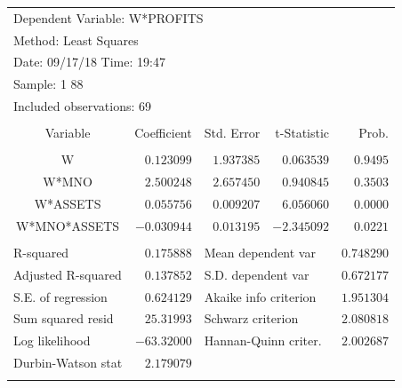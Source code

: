 \documentclass[12pt]{report}
\begin{document}
\begin{table}[H]
	\centering
	\begin{tabular}{lrrrr}
		\multicolumn{4}{l}{Dependent Variable: W*PROFITS}&\multicolumn{1}{c}{}\\
		\multicolumn{3}{l}{Method: Least Squares}&\multicolumn{1}{c}{}&\multicolumn{1}{c}{}\\
		\multicolumn{3}{l}{Date: 09/17/18   Time: 19:47}&\multicolumn{1}{c}{}&\multicolumn{1}{c}{}\\
		\multicolumn{2}{l}{Sample: 1 88}&\multicolumn{1}{c}{}&\multicolumn{1}{c}{}&\multicolumn{1}{c}{}\\
		\multicolumn{3}{l}{Included observations: 69}&\multicolumn{1}{c}{}&\multicolumn{1}{c}{}\\
		[4.5pt] \hline \\ [-4.5pt]
		\multicolumn{1}{c}{Variable}&\multicolumn{1}{r}{Coefficient}&\multicolumn{1}{r}{Std. Error}&\multicolumn{1}{r}{t-Statistic}&\multicolumn{1}{r}{Prob.}\\
		[4.5pt] \hline \\ [-4.5pt]
		\multicolumn{1}{c}{W}&\multicolumn{1}{r}{$0.123099$}&\multicolumn{1}{r}{$1.937385$}&\multicolumn{1}{r}{$0.063539$}&\multicolumn{1}{r}{$0.9495$}\\
		\multicolumn{1}{c}{W*MNO}&\multicolumn{1}{r}{$2.500248$}&\multicolumn{1}{r}{$2.657450$}&\multicolumn{1}{r}{$0.940845$}&\multicolumn{1}{r}{$0.3503$}\\
		\multicolumn{1}{c}{W*ASSETS}&\multicolumn{1}{r}{$0.055756$}&\multicolumn{1}{r}{$0.009207$}&\multicolumn{1}{r}{$6.056060$}&\multicolumn{1}{r}{$0.0000$}\\
		\multicolumn{1}{c}{W*MNO*ASSETS}&\multicolumn{1}{r}{$-0.030944$}&\multicolumn{1}{r}{$0.013195$}&\multicolumn{1}{r}{$-2.345092$}&\multicolumn{1}{r}{$0.0221$}\\
		[4.5pt] \hline \\ [-4.5pt]
		\multicolumn{1}{l}{R-squared}&\multicolumn{1}{r}{$0.175888$}&\multicolumn{2}{l}{Mean dependent var}&\multicolumn{1}{r}{$0.748290$}\\
		\multicolumn{1}{l}{Adjusted R-squared}&\multicolumn{1}{r}{$0.137852$}&\multicolumn{2}{l}{S.D. dependent var}&\multicolumn{1}{r}{$0.672177$}\\
		\multicolumn{1}{l}{S.E. of regression}&\multicolumn{1}{r}{$0.624129$}&\multicolumn{2}{l}{Akaike info criterion}&\multicolumn{1}{r}{$1.951304$}\\
		\multicolumn{1}{l}{Sum squared resid}&\multicolumn{1}{r}{$25.31993$}&\multicolumn{2}{l}{Schwarz criterion}&\multicolumn{1}{r}{$2.080818$}\\
		\multicolumn{1}{l}{Log likelihood}&\multicolumn{1}{r}{$-63.32000$}&\multicolumn{2}{l}{Hannan-Quinn criter.}&\multicolumn{1}{r}{$2.002687$}\\
		\multicolumn{1}{l}{Durbin-Watson stat}&\multicolumn{1}{r}{$2.179079$}&\multicolumn{1}{c}{}&\multicolumn{1}{c}{}&\multicolumn{1}{c}{}\\
		[4.5pt] \hline \\ [-4.5pt]
	\end{tabular}
\end{table} \vspace{-\baselineskip}
\end{document}
